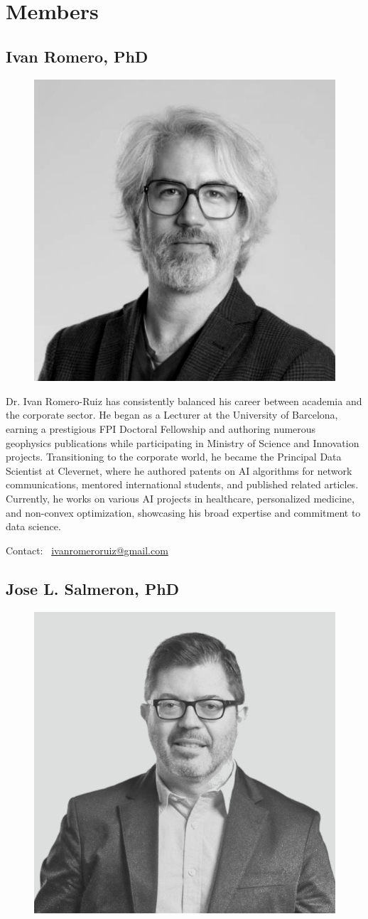 \section{Members} \label{sec:team}

\subsection{Ivan Romero, PhD}

\begin{figure}[!ht]
  \centering
  \includegraphics[width=.25\textwidth]{../../img/team/romero.png}
  \caption{}
\end{figure}

{\small 
Dr. Ivan Romero-Ruiz has consistently balanced his career between academia and the corporate sector. He began as a Lecturer at the University of Barcelona, earning a prestigious FPI Doctoral Fellowship and authoring numerous geophysics publications while participating in Ministry of Science and Innovation projects. Transitioning to the corporate world, he became the Principal Data Scientist at Clevernet, where he authored patents on AI algorithms for network communications, mentored international students, and published related articles. Currently, he works on various AI projects in healthcare, personalized medicine, and non-convex optimization, showcasing his broad expertise and commitment to data science.
}

Contact: \faEnvelope\ \href{mailto:ivanromeroruiz@gmail.com}{ivanromeroruiz@gmail.com}

\subsection{Jose L. Salmeron, PhD}

\begin{figure}[!ht]
  \centering
  \includegraphics[width=.25\textwidth]{../../img/team/salmeron.png}
  \caption{}
\end{figure}

